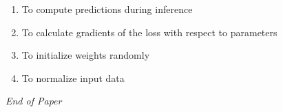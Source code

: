 \documentclass[12pt]{article}
\begin{document}
\begin{enumerate}[label=Q\arabic*.]
\begin{enumerate}[label=(\Alph*)]
    \item To compute predictions during inference
    \item To calculate gradients of the loss with respect to parameters
    \item To initialize weights randomly
    \item To normalize input data
\end{enumerate}
\end{enumerate}

\vfill
\noindent\textit{End of Paper}
\end{document}
